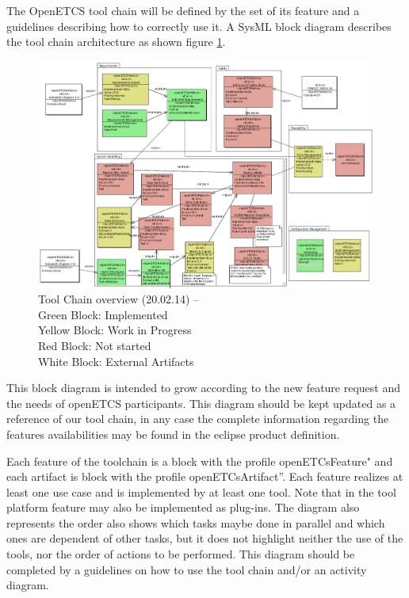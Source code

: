 The OpenETCS tool chain  will be defined by the set of its feature and
a guidelines describing how to correctly use it.
A SysML block diagram describes the tool chain architecture as shown
figure \ref{fig:overview}. 
\begin{figure}[htbp]
\includegraphics[width=\textwidth]{ToolChainmodel}
\caption{\label{fig:overview} Tool Chain overview (20.02.14) -- \\
  Green Block: Implemented \\
  Yellow Block: Work in Progress \\
  Red Block: Not started \\
  White Block: External Artifacts} 
\end{figure}

This block diagram is intended to grow according to the new feature request and the
needs of openETCS participants.  This diagram should be kept updated
as a reference of our tool chain, in any case the complete information
regarding the features availabilities  may be found in the eclipse product
definition.

Each feature of the toolchain is a block with the profile openETCsFeature"
and  each artifact is block with the profile openETCsArtifact''.  Each
feature realizes at least one use case and is implemented by at least
one tool. Note that in the tool platform feature  may also be
implemented as plug-ins.  The diagram also represents the order
also shows which tasks maybe done
in parallel and which ones are dependent of other tasks, but it does
not highlight neither the use of the tools, nor the order of actions
to be performed. This diagram should be completed by a guidelines on
how to use the tool chain and/or an activity diagram.

